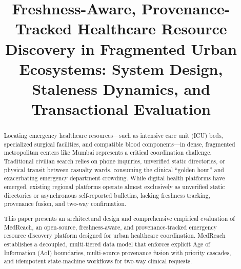 \documentclass[conference]{IEEEtran}
\begin{document}
\title{Freshness-Aware, Provenance-Tracked Healthcare Resource Discovery in Fragmented Urban Ecosystems: System Design, Staleness Dynamics, and Transactional Evaluation}

\author{
}

\maketitle

\begin{abstract}
Locating emergency healthcare resources---such as intensive care unit (ICU) beds, specialized surgical facilities, and compatible blood components---in dense, fragmented metropolitan centers like Mumbai represents a critical coordination challenge. Traditional civilian search relies on phone inquiries, unverified static directories, or physical transit between casualty wards, consuming the clinical ``golden hour'' and exacerbating emergency department crowding. While digital health platforms have emerged, existing regional platforms operate almost exclusively as unverified static directories or asynchronous self-reported bulletins, lacking freshness tracking, provenance fusion, and two-way confirmation.

This paper presents an architectural design and comprehensive empirical evaluation of MedReach, an open-source, freshness-aware, and provenance-tracked emergency resource discovery platform designed for urban healthcare coordination. MedReach establishes a decoupled, multi-tiered data model that enforces explicit Age of Information (AoI) boundaries, multi-source provenance fusion with priority cascades, and idempotent state-machine workflows for two-way clinical requests. 


\end{abstract}
\end{document}
